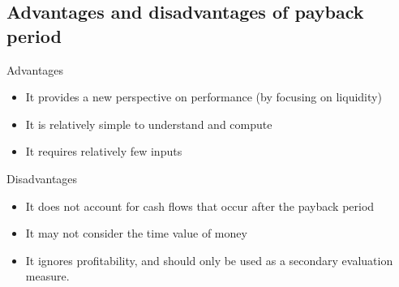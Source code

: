 \subsection{Advantages and disadvantages of payback period}
Advantages
\begin{itemize}
  \item It provides a new perspective on performance (by focusing on liquidity)
  \item It is relatively simple to understand and compute
  \item It requires relatively few inputs
\end{itemize}
Disadvantages
\begin{itemize}
  \item It does not account for cash flows that occur after the payback period
  \item It may not consider the time value of money
  \item It ignores profitability, and should only be used as a secondary evaluation measure.
\end{itemize}